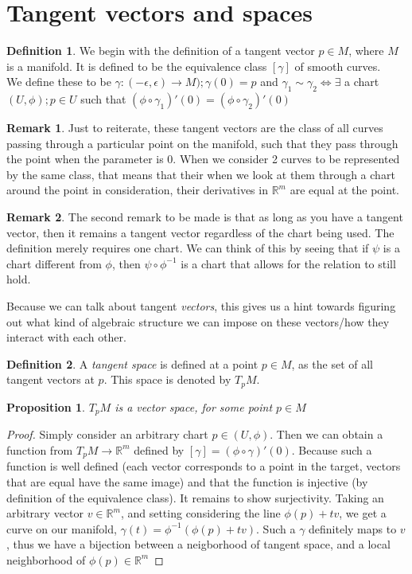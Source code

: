 \documentclass[12pt]{book}
\newtheorem{proposition}{Proposition}[section]
\theoremstyle{definition}
\newtheorem*{definition}{Definition}
\newtheorem*{remark}{Remark}
\begin{document}
\section{Tangent vectors and spaces}
\begin{definition}
    We begin with the definition of a tangent vector $p \in M$, where $M$ is a manifold. It is defined to be the equivalence class $[\gamma]$ of smooth curves. \\We define these to be $\gamma: (-\epsilon, \epsilon) \to M); \gamma(0) = p$ and $\gamma_1 \sim \gamma_2 \iff \exists$ a chart $(U, \phi); p \in U$ such that $(\phi \circ \gamma_1)' (0) = (\phi \circ \gamma_2)'(0)$
\end{definition}
\begin{remark}
    Just to reiterate, these tangent vectors are the class of all curves passing through a particular point on the manifold, such that they pass through the point when the parameter is 0. When we consider 2 curves to be represented by the same class, that means that their when we look at them through a chart around the point in consideration, their derivatives in $\mathbb{R}^m$ are equal at the point.
\end{remark}
\begin{remark}
    The second remark to be made is that as long as you have a tangent vector, then it remains a tangent vector regardless of the chart being used. The definition merely requires one chart. We can think of this by seeing that if $\psi$ is a chart different from $\phi$, then $\psi \circ \phi^{-1}$ is a chart that allows for the relation to still hold.
\end{remark}
Because we can talk about tangent \textit{vectors}, this gives us a hint towards figuring out what kind of algebraic structure we can impose on these vectors/how they interact with each other.
\begin{definition}
    A \textit{tangent space} is defined at a point $p \in M$, as the set of all tangent vectors at $p$. This space is denoted by $T_pM$.
\end{definition}
\begin{proposition}
    $T_pM$ is a vector space, for some point $p \in M$
\end{proposition}
\begin{proof}
    Simply consider an arbitrary chart $p \in (U, \phi)$. Then we can obtain a function from $T_pM \to \mathbb{R}^m$ defined by $[\gamma] = (\phi \circ \gamma)'(0)$. Because such a function is well defined (each vector corresponds to a point in the target, vectors that are equal have the same image) and that the function is injective (by definition of the equivalence class). It remains to show surjectivity. Taking an arbitrary vector $v \in \mathbb{R}^m$, and setting considering the line $\phi(p) + tv$, we get a curve on our manifold, $\gamma(t) = \phi^{-1}(\phi(p) + tv)$. Such a $\gamma$ definitely maps to $v$, thus we have a bijection between a neigborhood of tangent space, and a local neighborhood of $\phi(p) \in \mathbb{R}^m$  
\end{proof}
\end{document}
